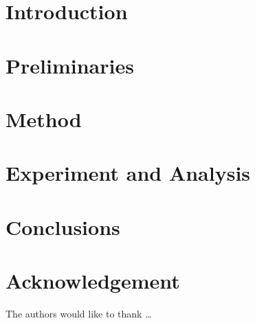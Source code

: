 \section{Introduction}\label{sec-intro}

\section{Preliminaries} \label{sec-preliminaries}

\section{Method} \label{sec-method}

\section{Experiment and Analysis} \label{sec-experiment}

\section{Conclusions} \label{sec-conclusions}

\section*{Acknowledgement}



The authors would like to thank \ldots

